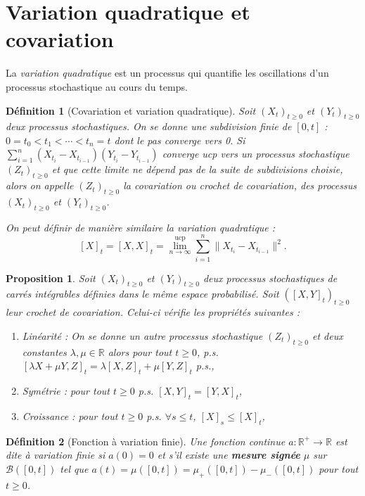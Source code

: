 \documentclass[openany]{book}
\newcommand{\R}{\mathbb{R}}
\newcommand{\1}{\mathbbm{1}}
\theoremstyle{thmfont}
\theoremstyle{deffont}
\newtheorem{definition}[definition]{Définition}
\theoremstyle{thmfont}
\newtheorem{prop}[prop]{Proposition}
\theoremstyle{deffont}
\begin{document}
\section{Variation quadratique et covariation}

La \textit{variation quadratique} est un processus qui quantifie les oscillations d'un processus stochastique au cours du temps. %

\begin{definition}[Covariation et variation quadratique] Soit $(X_t)_{t\geq0}$ et $(Y_t)_{t\geq0}$ deux processus stochastiques. 
  On se donne une subdivision finie de $[0,t]$ : $0 = t_0 < t_1 < \cdots < t_n = t$ dont le pas converge vers 0. Si $\sum_{i = 1}^n(X_{t_i} - X_{t_{i-1}})(Y_{t_i} - Y_{t_{i-1}})$ converge ucp vers un processus stochastique $(Z_t)_{t\geq0}$ et que cette limite ne dépend pas de la suite de subdivisions choisie, alors on appelle $(Z_t)_{t\geq0}$ la \textit{covariation} ou \textit{crochet de covariation}, des processus $(X_t)_{t\geq0}$ et $(Y_t)_{t\geq0}$.

 \noindent On peut définir de manière similaire la \textit{variation quadratique} :
 $$[X]_t = [X,X]_t = \lim_{n\to \infty}^{\text{ucp}} \sum_{i = 1}^n\|X_{t_i} - X_{t_{i-1}}\|^2.$$
\label{def:crochet}
\end{definition}


\begin{prop} Soit $(X_t)_{t\geq0}$ et $(Y_t)_{t\geq0}$ deux processus stochastiques de carrés intégrables définies dans le même espace probabilisé. Soit $([X,Y]_t)_{t\geq0}$ leur crochet de covariation. Celui-ci vérifie les propriétés suivantes : 
  \begin{enumerate}
  \item Linéarité : On se donne un autre processus stochastique $(Z_t)_{t\geq0}$ et deux constantes $\lambda, \mu \in \R$ alors pour tout $t\geq0$, p.s. $[\lambda X + \mu Y, Z]_t = \lambda[X,Z]_t + \mu[Y,Z]_t$ p.s.,
  \item Symétrie : pour tout $t\geq0$ p.s. $[X,Y]_t = [Y,X]_t$,
  \item Croissance : pour tout $t\geq0$ p.s. $\forall s\leq t$, $[X]_s \leq [X]_t$,
  \end{enumerate}
\end{prop}

\begin{definition}[Fonction à variation finie] Une fonction continue $a : \R^+ \rightarrow \R$ est dite \textit{à variation finie} si $a(0) = 0$ et s'il existe une \textbf{mesure
    signée} $\mu$ sur $\mathcal B([0,t])$ tel que $a(t) = \mu([0,t]) = \mu_+([0,t]) - \mu_-([0,t])$ pour tout $t \geq 0$.
\label{def:fct_var_finie}
\end{definition}
\end{document}
